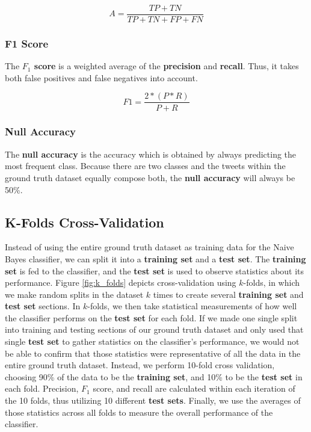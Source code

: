 \documentclass[11pt, twoside, reqno]{book}
\begin{document}
\[A=\frac{TP+TN}{TP+TN+FP+FN}\] 

\subsubsection{F1 Score}
\label{f1_score}

The \textbf{$F_{1}$ score} is a weighted average of the \textbf{precision} and \textbf{recall}. Thus, it takes both false positives and false negatives into account.

\[F1=\frac{2*(P*R)}{P+R}\] 

\subsubsection{Null Accuracy}
\label{null_accuracy}

The \textbf{null accuracy} is the accuracy which is obtained by always predicting the most frequent class. Because there are two classes and the tweets within the ground truth dataset equally compose both, the \textbf{null accuracy} will always be 50\%.

\subsection{K-Folds Cross-Validation}
\label{cross_validation}

Instead of using the entire ground truth dataset as training data for the Naive Bayes classifier, we can split it into a \textbf{training set} and a \textbf{test set}. The \textbf{training set} is fed to the classifier, and the \textbf{test set} is used to observe statistics about its performance. Figure \ref{fig:k_folds} depicts cross-validation using $k$-folds, in which we make random splits in the dataset $k$ times to create several \textbf{training set} and \textbf{test set} sections. In $k$-folds, we then take statistical measurements of how well the classifier performs on the \textbf{test set} for each fold. If we made one single split into training and testing sections of our ground truth dataset and only used that single \textbf{test set} to gather statistics on the classifier's performance, we would not be able to confirm that those statistics were representative of all the data in the entire ground truth dataset. Instead, we perform 10-fold cross validation, choosing 90\% of the data to be the \textbf{training set}, and 10\% to be the \textbf{test set} in each fold. Precision, $F_{1}$ score, and recall are calculated within each iteration of the 10 folds, thus utilizing 10 different \textbf{test sets}. Finally, we use the averages of those statistics across all folds to measure the overall performance of the classifier. 
\end{document}
